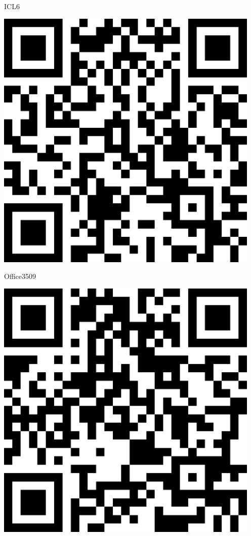 \documentclass[letterpaper]{article}
\begin{document}
 \hfill{\small ICL6} 

 \vspace{1in} 
 \pagebreak 
{} 
 \vspace*{\fill} 
 \begingroup 
 \centerline{\includegraphics[scale=1,width=5in,height=5in]{Office3509.png}} 
 \endgroup 
 \vspace*{\fill} 

 \hfill{\small Office3509} 

 \vspace{1in} 
 \pagebreak 
{} 
 \vspace*{\fill} 
 \begingroup 
 \centerline{\includegraphics[scale=1,width=5in,height=5in]{Office3511.png}} 
 \endgroup 
 \vspace*{\fill} 
\end{document}
